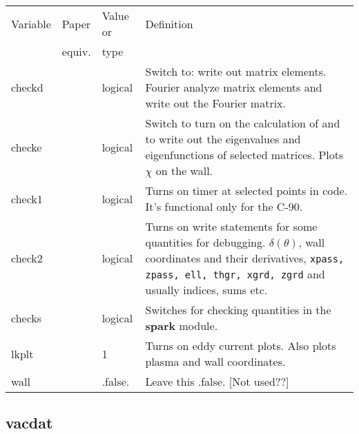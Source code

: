 \documentclass[10pt]{article}
\newcommand{\style}[1]{\texttt{#1}}
\begin{document}
\begin{center}
\begin{tabular}{|l|l|p{1.0in}|p{3.8in}|}
\hline
Variable & Paper  & Value or &  Definition \\ 
         & equiv. &  type  & \\ \hline

checkd & & logical & Switch to: write out matrix elements. Fourier
                     analyze matrix elements and write out the
                     Fourier matrix.  \\

checke & & logical & Switch to turn on the calculation of and to write
                      out the eigenvalues and eigenfunctions of
                      selected matrices. Plots $\chi$ on the wall.\\

check1 & & logical &  Turns on timer at selected points in code. It's
                      functional only for the C-90.\\

check2 & & logical & Turns on write statements for some quantities for
                      debugging. $\delta(\theta)$, wall coordinates
                      and their derivatives, \style{xpass, zpass, ell,
                      thgr, xgrd, zgrd} and usually indices, sums
                      etc.\\

checks & & logical & Switches for checking quantities in the
                     \textbf{spark} module.\\

lkplt & & 1 & Turns on eddy current plots. Also plots plasma and wall
               coordinates. \\

wall  &  &.false.  &  Leave this .false. [Not used??]\\
\hline
\end{tabular}
\end{center}

\subsection{vacdat}
\end{document}

